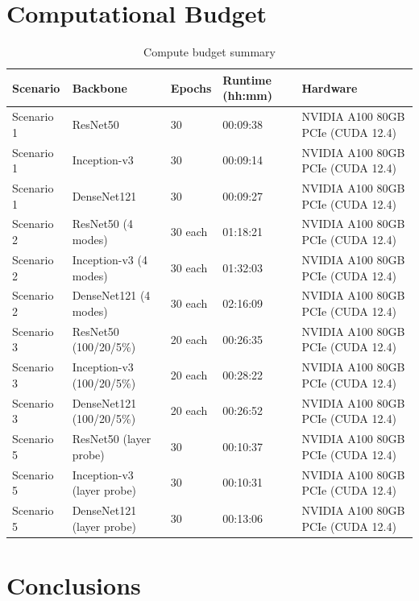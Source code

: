 \documentclass[11pt,a4paper]{report}
\begin{document}
\chapter{Computational Budget}

\begin{table}[H]
\centering
\caption{Compute budget summary}
\label{tab:budget}
\begin{tabular}{lllll}
\toprule
\rowcolor{tableheader}
\textbf{Scenario} & \textbf{Backbone} & \textbf{Epochs} & \textbf{Runtime (hh:mm)} & \textbf{Hardware} \\
\midrule
Scenario 1 & ResNet50 & 30 & 00:09:38 & NVIDIA A100 80GB PCIe (CUDA 12.4) \\
Scenario 1 & Inception-v3 & 30 & 00:09:14 & NVIDIA A100 80GB PCIe (CUDA 12.4) \\
Scenario 1 & DenseNet121 & 30 & 00:09:27 & NVIDIA A100 80GB PCIe (CUDA 12.4) \\
Scenario 2 & ResNet50 (4 modes) & 30 each & 01:18:21 & NVIDIA A100 80GB PCIe (CUDA 12.4) \\
Scenario 2 & Inception-v3 (4 modes) & 30 each & 01:32:03 & NVIDIA A100 80GB PCIe (CUDA 12.4) \\
Scenario 2 & DenseNet121 (4 modes) & 30 each & 02:16:09 & NVIDIA A100 80GB PCIe (CUDA 12.4) \\
Scenario 3 & ResNet50 (100/20/5\%) & 20 each & 00:26:35 & NVIDIA A100 80GB PCIe (CUDA 12.4) \\
Scenario 3 & Inception-v3 (100/20/5\%) & 20 each & 00:28:22 & NVIDIA A100 80GB PCIe (CUDA 12.4) \\
Scenario 3 & DenseNet121 (100/20/5\%) & 20 each & 00:26:52 & NVIDIA A100 80GB PCIe (CUDA 12.4) \\
Scenario 5 & ResNet50 (layer probe) & 30 & 00:10:37 & NVIDIA A100 80GB PCIe (CUDA 12.4) \\
Scenario 5 & Inception-v3 (layer probe) & 30 & 00:10:31 & NVIDIA A100 80GB PCIe (CUDA 12.4) \\
Scenario 5 & DenseNet121 (layer probe) & 30 & 00:13:06 & NVIDIA A100 80GB PCIe (CUDA 12.4) \\
\bottomrule
\end{tabular}
\end{table}

\chapter{Conclusions}
\end{document}
